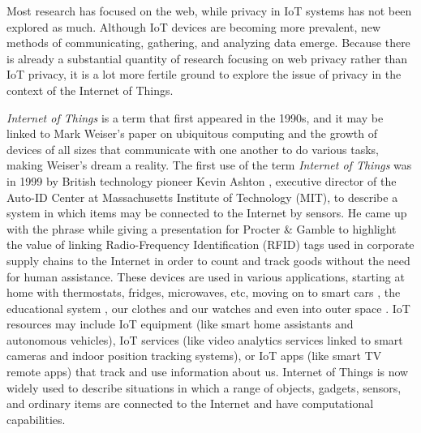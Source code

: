 \documentclass[conference]{IEEEtran}
\begin{document}
Most research has focused on the web, while privacy in IoT systems has not
been explored as much. Although IoT devices are becoming more prevalent,
new methods of communicating, gathering, and analyzing data emerge.
Because there is already a substantial quantity of research focusing on web
privacy rather than IoT privacy, it is a lot more fertile ground to explore
the issue of privacy in the context of the Internet of Things.

\textit{Internet of Things} is a term that first appeared in the 1990s,
and it may be linked to Mark Weiser's paper on ubiquitous computing \cite{weiser1991computer}
and the growth of devices of all sizes that communicate with one another
to do various tasks, making Weiser's dream a reality. The first use of the
term \textit{Internet of Things} was in 1999 by British technology pioneer
Kevin Ashton \cite{KevinThat}, executive director of the Auto-ID Center at
Massachusetts Institute of Technology (MIT), to describe a system in which
items may be connected to the Internet by sensors. He came up with the phrase
while giving a presentation for Procter \& Gamble to highlight the value
of linking Radio-Frequency Identification (RFID) tags used in corporate
supply chains to the Internet in order to count and track goods without the
need for human assistance. These devices are used in various applications,
starting at home \cite{marikyan2019systematic} with thermostats, fridges,
microwaves, etc, moving on to smart cars \cite{arena2020overview}, the
educational system \cite{al2020survey}, our clothes and our watches \cite{niknejad2020comprehensive}
and even into outer space \cite{AkyildizInternet}. IoT resources may include
IoT equipment (like smart home assistants and autonomous vehicles), IoT
services (like video analytics services linked to smart cameras and indoor
position tracking systems), or IoT apps (like smart TV remote apps) that
track and use information about us. Internet of Things is now widely used
to describe situations in which a range of objects, gadgets, sensors, and
ordinary items are connected to the Internet and have computational capabilities.
\end{document}
